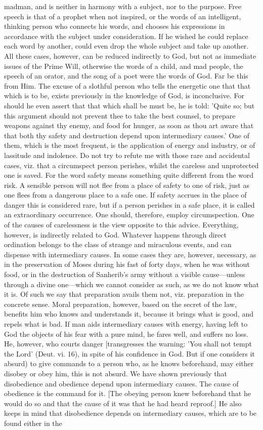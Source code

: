 \documentclass[12pt]{article}
\begin{document}
madman, and is neither in harmony with a subject, nor to the purpose. Free speech is that of a prophet when not inspired, or the words of an intelligent, thinking person who connects his words, and chooses his expressions in accordance with the subject under consideration. If he wished he could replace each word by another, could even drop the whole subject and take up another. All these cases, however, can be reduced indirectly to God, but not as immediate issues of the Prime Will, otherwise the words of a child, and mad people, the speech of an orator, and the song of a poet were the words of God. Far be this from Him. The excuse of a slothful person who tells the energetic one that that which is to be, exists previously in the knowledge of God, is inconclusive. For should he even assert that that which shall be must be, he is told: 'Quite so; but this argument should not prevent thee to take the best counsel, to prepare weapons against thy enemy, and food for hunger, as soon as thou art aware that that both thy safety and destruction depend upon intermediary causes.' One of them, which is the most frequent, is the application of energy and industry, or of lassitude and indolence. Do not try to refute me with those rare and accidental cases, viz. that a circumspect person perishes, whilst the careless and unprotected one is saved. For the word safety means something quite different from the word risk. A sensible person will not flee from a place of safety to one of risk, just as one flees from a dangerous place to a safe one. If safety accrues in the place of danger this is considered rare, but if a person perishes in a safe place, it is called an extraordinary occurrence. One should, therefore, employ circumspection. One of the causes of carelessness is the view opposite to this advice. Everything, however, is indirectly related to God. Whatever happens through direct ordination belongs to the class of strange and miraculous events, and can dispense with intermediary causes. In some cases they are, however, necessary, as in the preservation of Moses during his fast of forty days, when he was without food, or in the destruction of Sanherib's army without a visible cause---unless through a divine one---which we cannot consider as such, as we do not know what it is. Of such we say that preparation avails them not, viz. preparation in the concrete sense. Moral preparation, however, based on the secret of the law, benefits him who knows and understands it, because it brings what is good, and repels what is bad. If man aids intermediary causes with energy, having left to God the objects of his fear with a pure mind, he fares well, and suffers no loss. He, however, who courts danger [transgresses the warning: 'You shall not tempt the Lord' (Deut. vi. 16), in spite of his confidence in God. But if one considers it absurd) to give commands to a person who, as he knows beforehand, may either disobey or obey him, this is not absurd. We have shown previously that disobedience and obedience depend upon intermediary causes. The cause of obedience is the command for it. [The obeying person knew beforehand that he would do so and that the cause of it was that he had heard reproof.] He also keeps in mind that disobedience depends on intermediary causes, which are to be found either in the 
\end{document}
